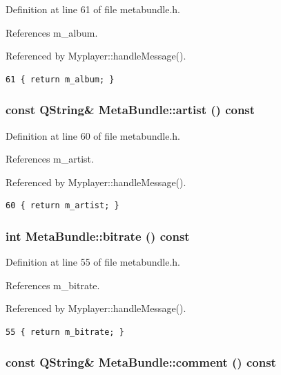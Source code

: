 Definition at line 61 of file metabundle.h.

References m\_\-album.

Referenced by Myplayer::handle\-Message().



\footnotesize\begin{verbatim}61 { return m_album; }
\end{verbatim}\normalsize 
{}
\subsubsection{\setlength{\rightskip}{0pt plus 5cm}const QString\& Meta\-Bundle::artist () const\hspace{0.3cm}{\tt  [inline]}}\label{classMetaBundle_MetaBundlea11}




Definition at line 60 of file metabundle.h.

References m\_\-artist.

Referenced by Myplayer::handle\-Message().



\footnotesize\begin{verbatim}60 { return m_artist; }
\end{verbatim}\normalsize 
{}
\subsubsection{\setlength{\rightskip}{0pt plus 5cm}int Meta\-Bundle::bitrate () const\hspace{0.3cm}{\tt  [inline]}}\label{classMetaBundle_MetaBundlea6}




Definition at line 55 of file metabundle.h.

References m\_\-bitrate.

Referenced by Myplayer::handle\-Message().



\footnotesize\begin{verbatim}55 { return m_bitrate; }
\end{verbatim}\normalsize 
{}
\subsubsection{\setlength{\rightskip}{0pt plus 5cm}const QString\& Meta\-Bundle::comment () const\hspace{0.3cm}{\tt  [inline]}}\label{classMetaBundle_MetaBundlea14}




